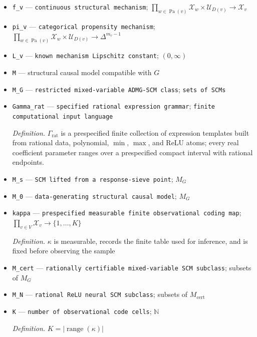 \documentclass{article}
\begin{document}
\begin{itemize}
  \item \texttt{f\_\allowbreak{}v} --- \texttt{continuous structural mechanism}; \(\prod_{w\in\operatorname{Pa}(v)}\mathcal X_w\times\mathcal U_{D(v)}\to\mathcal X_v\)
  \item \texttt{pi\_\allowbreak{}v} --- \texttt{categorical propensity mechanism}; \(\prod_{w\in\operatorname{Pa}(v)}\mathcal X_w\times\mathcal U_{D(v)}\to\Delta^{m_v-1}\)
  \item \texttt{L\_\allowbreak{}v} --- \texttt{known mechanism Lipschitz constant}; \((0,\infty)\)
  \item \texttt{M} --- structural causal model compatible with \(G\)
  \item \texttt{M\_\allowbreak{}G} --- \texttt{restricted mixed-\allowbreak{}variable ADMG-\allowbreak{}SCM class}; \texttt{sets of SCMs}
  \item \texttt{Gamma\_\allowbreak{}rat} --- \texttt{specified rational expression grammar}; \texttt{finite computational input language}
  \par\smallskip\noindent\emph{Definition.} \(\Gamma_{\mathrm{rat}}\) is a prespecified finite collection of expression templates built from rational data, polynomial, \(\min\), \(\max\), and ReLU atoms; every real coefficient parameter ranges over a prespecified compact interval with rational endpoints.
  \item \texttt{M\_\allowbreak{}s} --- \texttt{SCM lifted from a response-\allowbreak{}sieve point}; \(M_G\)
  \item \texttt{M\_\allowbreak{}0} --- \texttt{data-\allowbreak{}generating structural causal model}; \(M_G\)
  \item \texttt{kappa} --- \texttt{prespecified measurable finite observational coding map}; \(\prod_{v\in V}\mathcal X_v\to\{1,\ldots,K\}\)
  \par\smallskip\noindent\emph{Definition.} \(\kappa\) is measurable, records the finite table used for inference, and is fixed before observing the sample
  \item \texttt{M\_\allowbreak{}cert} --- \texttt{rationally certifiable mixed-\allowbreak{}variable SCM subclass}; subsets of \(M_G\)
  \item \texttt{M\_\allowbreak{}N} --- \texttt{rational ReLU neural SCM subclass}; subsets of \(M_{\mathrm{cert}}\)
  \item \texttt{K} --- \texttt{number of observational code cells}; \(\mathbb N\)
  \par\smallskip\noindent\emph{Definition.} \(K=|\operatorname{range}(\kappa)|\)

\end{itemize}
\end{document}
